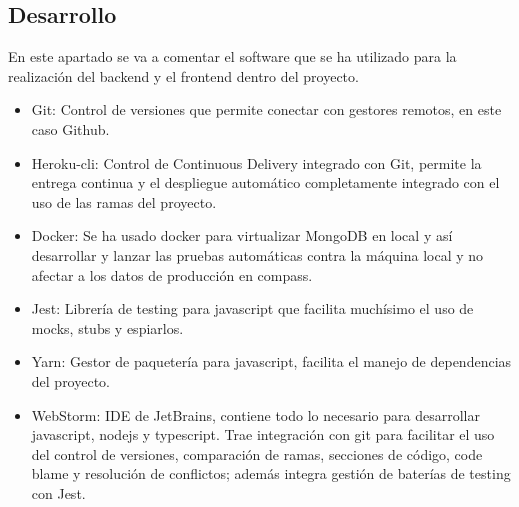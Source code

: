 \subsection{Desarrollo}
En este apartado se va a comentar el software que se ha utilizado para la realización del backend y el frontend dentro del proyecto.
\begin{itemize}
    \item Git: Control de versiones que permite conectar con gestores remotos, en este caso Github.
    \item Heroku-cli: Control de Continuous Delivery integrado con Git, permite la entrega continua y el despliegue automático completamente integrado con el uso de las ramas del proyecto.
    \item Docker: Se ha usado docker para virtualizar MongoDB en local y así desarrollar y lanzar las pruebas automáticas contra la máquina local y no afectar a los datos de producción en compass.
    \item Jest: Librería de testing para javascript que facilita muchísimo el uso de mocks, stubs y espiarlos.
    \item Yarn: Gestor de paquetería para javascript, facilita el manejo de dependencias del proyecto.
    \item WebStorm: IDE de JetBrains, contiene todo lo necesario para desarrollar javascript, nodejs y typescript. Trae integración con git para facilitar el uso del control de versiones, comparación de ramas, secciones de código, code blame y resolución de conflictos; además integra gestión de baterías de testing con Jest.
\end{itemize}